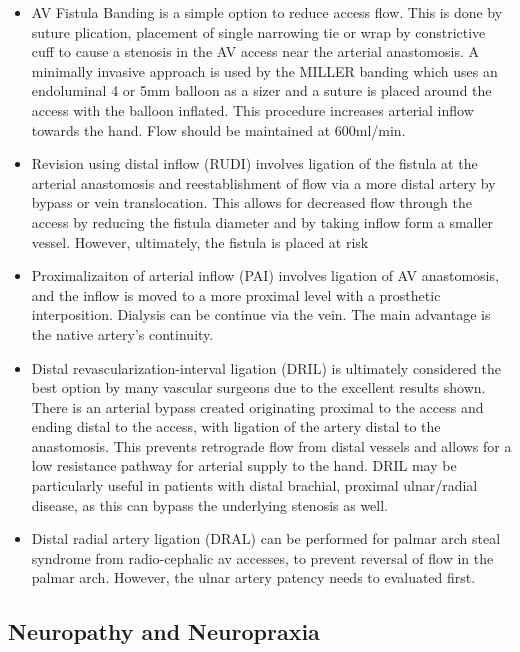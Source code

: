 \documentclass[
]{book}
\begin{document}
\begin{itemize}
\item
  AV Fistula Banding is a simple option to reduce access flow. This is
  done by suture plication, placement of single narrowing tie or wrap
  by constrictive cuff to cause a stenosis in the AV access near the
  arterial anastomosis. A minimally invasive approach is used by the
  MILLER banding which uses an endoluminal 4 or 5mm balloon as a sizer
  and a suture is placed around the access with the balloon inflated.
  This procedure increases arterial inflow towards the hand. Flow
  should be maintained at 600ml/min.
\item
  Revision using distal inflow (RUDI) involves ligation of the fistula
  at the arterial anastomosis and reestablishment of flow via a more
  distal artery by bypass or vein translocation. This allows for
  decreased flow through the access by reducing the fistula diameter
  and by taking inflow form a smaller vessel. However, ultimately, the
  fistula is placed at risk
\item
  Proximalizaiton of arterial inflow (PAI) involves ligation of AV
  anastomosis, and the inflow is moved to a more proximal level with a
  prosthetic interposition. Dialysis can be continue via the vein. The
  main advantage is the native artery's continuity.\citep{zanow2006}
\item
  Distal revascularization-interval ligation (DRIL) is ultimately
  considered the best option by many vascular surgeons due to the
  excellent results shown. There is an arterial bypass created
  originating proximal to the access and ending distal to the access,
  with ligation of the artery distal to the anastomosis. This prevents
  retrograde flow from distal vessels and allows for a low resistance
  pathway for arterial supply to the hand. DRIL may be particularly
  useful in patients with distal brachial, proximal ulnar/radial
  disease, as this can bypass the underlying stenosis as
  well.\citep{leake2015}
\item
  Distal radial artery ligation (DRAL) can be performed for palmar
  arch steal syndrome from radio-cephalic av accesses, to prevent
  reversal of flow in the palmar arch. However, the ulnar artery
  patency needs to evaluated first.
\end{itemize}

\hypertarget{neuropathy-and-neuropraxia}{%
\subsection{Neuropathy and Neuropraxia}\label{neuropathy-and-neuropraxia}}
\end{document}
